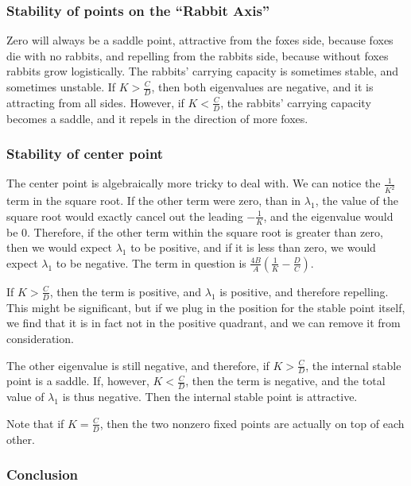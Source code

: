 \documentclass{article}
\begin{document}
\subsubsection{Stability of points on the ``Rabbit Axis''}

Zero will always be a saddle point, attractive from the foxes
	side, because foxes die with no rabbits,
	and repelling from the rabbits side, because without foxes
	rabbits grow logistically.
The rabbits' carrying capacity is sometimes stable, and sometimes
	unstable.
If $K > \frac{C}{D}$, then both eigenvalues are negative,
	and it is attracting from all sides.
However, if $K < \frac{C}{D}$, the rabbits' carrying capacity
	becomes a saddle, and it repels in the direction of more foxes.

\subsubsection{Stability of center point}

The center point is algebraically more tricky to deal with.
We can notice the $\frac{1}{K^2}$ term in the square root.
If the other term were zero, than in $\lambda_1$,
	the value of the square root would exactly cancel out
	the leading $- \frac{1}{K}$, and the eigenvalue would be $0$.
Therefore, if the other term within the square root is greater 
	than zero, then we would expect $\lambda_1$ to be positive,
	and if it is less than zero, we would expect $\lambda_1$
	to be negative.
The term in question is 
	$\frac{4 B}{A} \left( \frac{1}{K} - \frac{D}{C} \right)$.

If $K > \frac{C}{D}$, then the term is positive, and $\lambda_1$
	is positive, and therefore repelling.
This might be significant, but if we plug in the position for the
	stable point itself, we find that it is in fact not in
	the positive quadrant, and we can remove it from consideration.

The other eigenvalue is still negative, and therefore, if $K > \frac{C}{D}$,
	the internal stable point is a saddle.
If, however, $K < \frac{C}{D}$, then the term is negative,
	and the total value of $\lambda_1$ is thus negative.
Then the internal stable point is attractive.

Note that if $K = \frac{C}{D}$, then the two nonzero fixed points
	are actually on top of each other.

\subsubsection{Conclusion}
\end{document}
